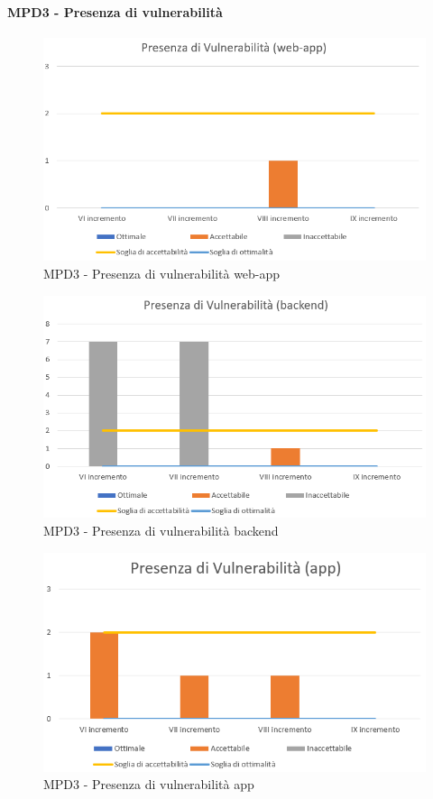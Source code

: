   \clearpage
  \paragraph{MPD3 - Presenza di vulnerabilità}
  \begin{figure}[h!]
    \centering
      \includegraphics[scale=1]{Immagini/Vuln WAA.PNG}
    \caption{MPD3 - Presenza di vulnerabilità web-app}
  \end{figure}

  \begin{figure}[h!]
    \centering
      \includegraphics[scale=1]{Immagini/Vuln BEA.PNG}
    \caption{MPD3 - Presenza di vulnerabilità backend}
  \end{figure}

  \begin{figure}[h!]
    \centering
      \includegraphics[scale=1]{Immagini/Vuln APPA.PNG}
    \caption{MPD3 - Presenza di vulnerabilità app}
  \end{figure}



